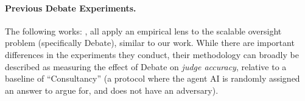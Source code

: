 \paragraph{Previous Debate Experiments.} The following works: \allpreviousworks, all apply an empirical lens to the scalable oversight problem (specifically Debate), similar to our work. While there are important differences in the experiments they conduct, their methodology can broadly be described as measuring the effect of Debate on \emph{judge accuracy}, relative to a baseline of ``Consultancy'' (a protocol where the agent AI is randomly assigned an answer to argue for, and does not have an adversary). %


